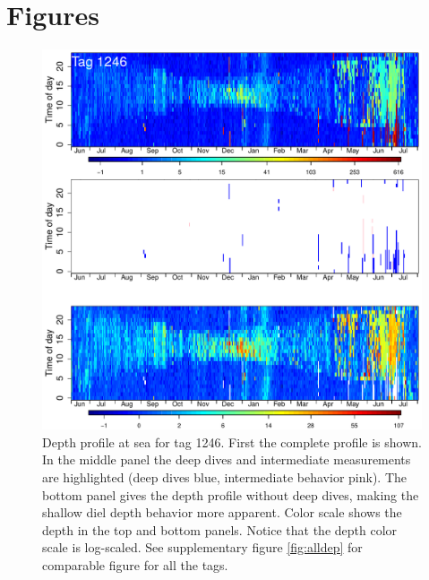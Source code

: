 \section*{Figures}
\begin{figure}[ht]
  \centering
  \includegraphics[width=\linewidth]{fig1.pdf}
  \caption{Depth profile at sea for tag 1246. First the complete profile is shown. In the middle panel the deep dives and intermediate measurements are highlighted (deep dives blue, intermediate behavior pink). 
The bottom panel gives the depth profile without deep dives, making the
shallow diel depth behavior more apparent. 
Color scale shows the depth in the top and bottom panels. Notice that the depth color scale is log-scaled. See supplementary figure \ref{fig:alldep} for comparable figure for all the tags.}
  \label{fig:heatmap}
\end{figure}

